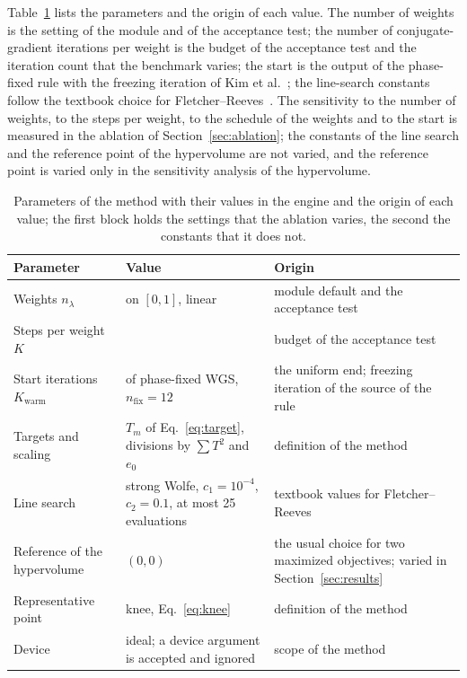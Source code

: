 Table~\ref{tab:params} lists the parameters and the origin of each value. The number of weights is the setting of the module and of the acceptance test; the number of conjugate-gradient iterations per weight is the budget of the acceptance test and the iteration count that the benchmark varies;
the start is the output of the phase-fixed rule with the freezing iteration of Kim et al.~\cite{kim2019}; the line-search constants follow the textbook choice for Fletcher--Reeves~\cite{nocedal}. The sensitivity to the number of weights, to the steps per weight, to the schedule of the weights and to the start is measured in the ablation of
Section~\ref{sec:ablation}; the constants of the line search and the reference point of the hypervolume are not varied, and the reference point is varied only in the sensitivity analysis of the hypervolume.

\begin{table}[t]
\centering\small
\caption{Parameters of the method with their values in the engine and the origin of each value; the first block holds the settings that the ablation varies, the second the constants that it does not.}
\label{tab:params}
\begin{tabular}{@{}p{4.6cm} p{3.6cm} p{5.8cm}@{}}
\toprule
Parameter & Value & Origin\\
\midrule
Weights $n_\lambda$ & \nLambda{} on $[0,1]$, linear & module default and the acceptance test\\
Steps per weight $K$ & \cgIters{} & budget of the acceptance test\\
Start iterations $K_{\mathrm{warm}}$ & \warmIters{} of phase-fixed WGS, $n_{\mathrm{fix}}=12$ & the uniform end; freezing iteration of the source of the rule~\cite{kim2019}\\
Targets and scaling & $T_m$ of Eq.~\ref{eq:target}, divisions by $\sum T^2$ and $e_0$ & definition of the method\\
\midrule
Line search & strong Wolfe, $c_1=10^{-4}$, $c_2=0.1$, at most 25 evaluations & textbook values for Fletcher--Reeves~\cite{nocedal}\\
Reference of the hypervolume & $(0,0)$ & the usual choice for two maximized objectives; varied in Section~\ref{sec:results}\\
Representative point & knee, Eq.~\ref{eq:knee} & definition of the method\\
Device & ideal; a device argument is accepted and ignored & scope of the method\\
\bottomrule
\end{tabular}
\end{table}

